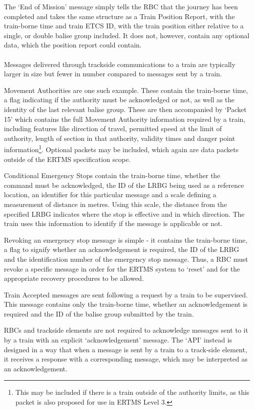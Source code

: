 \documentclass[twoside,11pt,a4paper]{article}
\begin{document}
The `End of Mission' message simply tells the RBC that the journey has been completed and takes the same structure as a Train Position Report, with the train-borne time and train ETCS ID, with the train position either relative to a single, or double balise group included. It does not, however, contain any optional data, which the position report could contain.\\\\
Messages delivered through trackside communications to a train are typically larger in size but fewer in number compared to messages sent by a train.

Movement Authorities are one such example. These contain the train-borne time, a flag indicating if the authority must be acknowledged or not, as well as the identity of the last relevant balise group. These are then accompanied by `Packet 15' which contains the full Movement Authority information required by a train, including features like direction of travel, permitted speed at the limit of authority, length of section in that authority, validity times and danger point information\footnote{This may be included if there is a train outside of the authority limits, as this packet is also proposed for use in ERTMS Level 3.}. Optional packets may be included, which again are data packets outside of the ERTMS specification scope.

Conditional Emergency Stops contain the train-borne time, whether the command must be acknowledged, the ID of the LRBG being used as a reference location, an identifier for this particular message and a scale defining a measurement of distance in metres. Using this scale, the distance from the specified LRBG indicates where the stop is effective and in which direction. The train uses this information to identify if the message is applicable or not.

Revoking an emergency stop message is simple - it contains the train-borne time, a flag to signify whether an acknowledgement is required, the ID of the LRBG and the identification number of the emergency stop message. Thus, a RBC must revoke a specific message in order for the ERTMS system to `reset' and for the appropriate recovery procedures to be allowed.

Train Accepted messages are sent following a request by a train to be supervised. This message contains only the train-borne time, whether an acknowledgement is required and the ID of the balise group submitted by the train.

RBCs and trackside elements are not required to acknowledge messages sent to it by a train with an explicit `acknowledgement' message. The `API' instead is designed in a way that when a message is sent by a train to a track-side element, it receives a response with a corresponding message, which may be interpreted as an acknowledgement.
\end{document}
